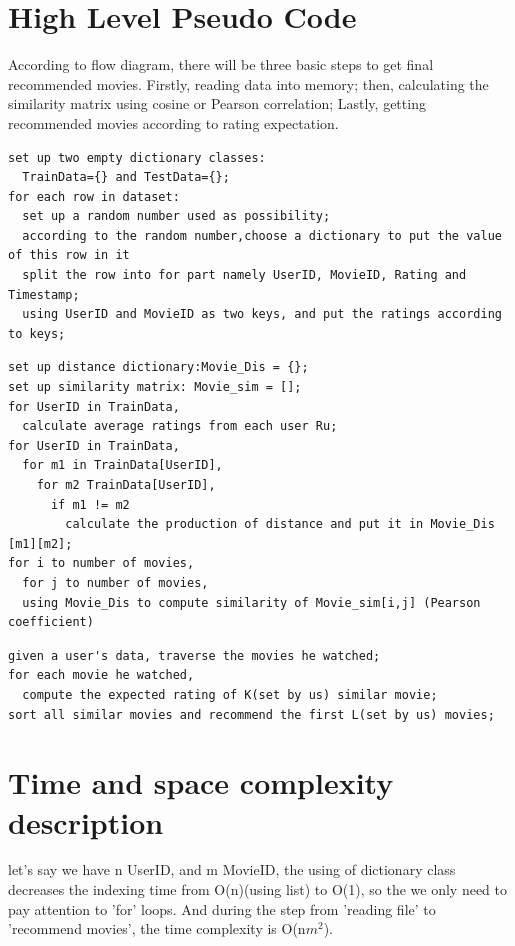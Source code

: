 \documentclass[two column]{article}
\begin{document}
\section{High Level Pseudo Code}
According to flow diagram, there will be three basic steps to get final recommended movies. Firstly, reading data into memory; then, calculating the similarity matrix using cosine or Pearson correlation; Lastly, getting recommended movies according to rating expectation.

\begin{lstlisting}[title=Flow1: Reading file into program, frame=shadowbox]
set up two empty dictionary classes:  
  TrainData={} and TestData={};
for each row in dataset:
  set up a random number used as possibility;
  according to the random number,choose a dictionary to put the value of this row in it
  split the row into for part namely UserID, MovieID, Rating and Timestamp;
  using UserID and MovieID as two keys, and put the ratings according to keys;
\end{lstlisting}
\begin{lstlisting}[title=Flow2: calculate the similarity matrix , frame=shadowbox]
set up distance dictionary:Movie_Dis = {};
set up similarity matrix: Movie_sim = [];
for UserID in TrainData,
  calculate average ratings from each user Ru;
for UserID in TrainData,
  for m1 in TrainData[UserID],
    for m2 TrainData[UserID],
      if m1 != m2
	    calculate the production of distance and put it in Movie_Dis [m1][m2];
for i to number of movies,
  for j to number of movies,
  using Movie_Dis to compute similarity of Movie_sim[i,j] (Pearson coefficient)
\end{lstlisting} 

\begin{lstlisting}[title=Flow3: recommend movies, frame=shadowbox]
given a user's data, traverse the movies he watched;
for each movie he watched,
  compute the expected rating of K(set by us) similar movie;
sort all similar movies and recommend the first L(set by us) movies;
\end{lstlisting}


\section{Time and space complexity description}
\par let's say we have n UserID, and m MovieID, the using of dictionary class decreases the indexing time from O(n)(using list) to O(1), so the we only need to pay attention to 'for' loops. And during the step from 'reading file' to 'recommend movies', the time complexity is O(n$m^2$).
\end{document}
